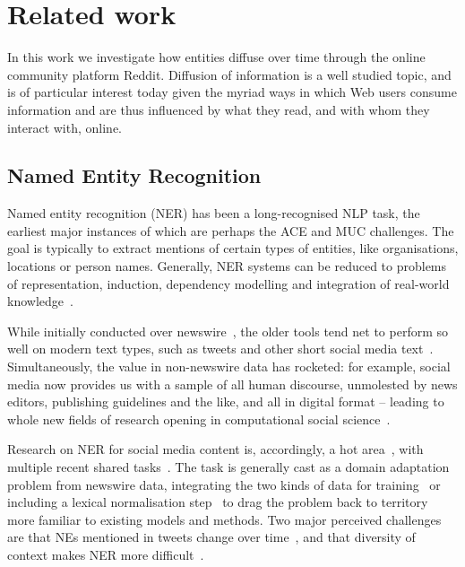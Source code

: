 \documentclass[journal,10pt,draftclsnofoot,onecolumn]{IEEEtran}
\begin{document}

\section{Related work}
In this work we investigate how entities diffuse over time through the online community platform Reddit.
Diffusion of information is a well studied topic, and is of particular interest today given the myriad ways in which Web users consume information and are thus influenced by what they read, and with whom they interact with, online.

\subsection{Named Entity Recognition}
Named entity recognition (NER) has been a long-recognised NLP task, the earliest major instances of which are perhaps the ACE and MUC challenges.
The goal is typically to extract mentions of certain types of entities, like organisations, locations or person names.
Generally, NER systems can be reduced to problems of representation, induction, dependency modelling and integration of real-world knowledge~\cite{nadeau2007survey,RatinovRo09}.

While initially conducted over newswire~\cite{tjong2003introduction}, the older tools tend net to perform so well on modern text types, such as tweets and other short social media text~\cite{derczynski2013microblog}.
Simultaneously, the value in non-newswire data has rocketed: for example, social media now provides us with a sample of all human discourse, unmolested by news editors, publishing guidelines and the like, and all in digital format -- leading to whole new fields of research opening in computational social science~\cite{hovy2015user,plank2015personality,preoctiuc2015studying}.

Research on NER for social media content is, accordingly, a hot area~\cite{ritter2011named,liu2011recognizing,plank2014adapting,cherryunreasonable}, with multiple recent shared tasks~\cite{rowe2015microposts2015,baldwin2015shared}.
The task is generally cast as a domain adaptation problem from newswire data, integrating the two kinds of data for training~\cite{cherryunreasonable} or including a lexical normalisation step~\cite{han2011lexical} to drag the problem back to territory more familiar to existing models and methods.
Two major perceived challenges are that NEs mentioned in tweets change over time~\cite{derczynski2013microblog,fromreide2014crowdsourcing}, and that diversity of context makes NER more difficult~\cite{derczynski2015analysis}. 
\end{document}
